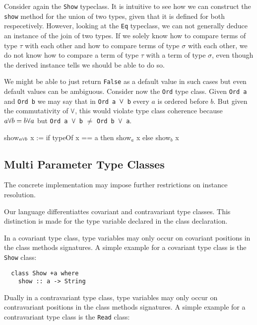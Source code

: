 Consider again the \texttt{Show} typeclass. It is intuitive to see how we can construct the \texttt{show} method for the union of two types, given that it is defined for both respecetively.
However, looking at the \texttt{Eq} typeclass, we can not generally deduce an instance of the join of two types.
If we solely know how to compare terms of type $\tau$ with each other and how to compare terms of type $\sigma$ with each other,
we do not know how to compare a term of type $\tau$ with a term of type $\sigma$, even though the derived instance tells we should be able to do so.

We might be able to just return \texttt{False} as a default value in such cases but even default values can be ambiguous.
Consider now the \texttt{Ord} type class. Given \texttt{Ord a} and \texttt{Ord b} we may say that in \texttt{Ord a $\join$ b} every $a$ is ordered before $b$.
But given the commutativity of $\join$, this would violate type class coherence because $a \join b = b \join a$ but \texttt{Ord a $\join$ b} $\neq$ \texttt{Ord b $\join$ a}.

\begin{listing}
  show$_{a\join b}$ x := if typeOf x == a then show$_a$ x else show$_b$ x
\end{listing}


\subsection{Multi Parameter Type Classes}

The concrete implementation may impose further restrictions on instance resolution.

Our language differentiattes covariant and contravariant type classes.
This distinction is made for the type variable declared in the class declaration.

In a covariant type class, type variables may only occur on covariant positions in the class methods signatures.
A simple example for a covariant type class is the \texttt{Show} class:

\begin{verbatim}
  class Show +a where
    show :: a -> String
\end{verbatim}

Dually in a contravariant type class, type variables may only occur on contravariant positions in the class methods signatures.
A simple example for a contravariant type class is the \texttt{Read} class:

